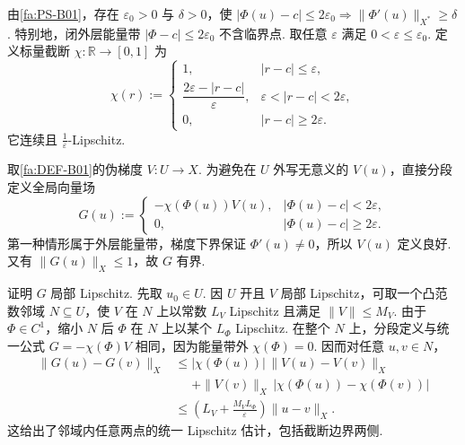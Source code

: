 \begin{FAProof}
由\autoref{fa:PS-B01}，存在 \(\displaystyle\varepsilon_0>0\) 与 \(\displaystyle\delta>0\)，使
\(\displaystyle |\Phi(u)-c|\leqslant2\varepsilon_0 \Longrightarrow \|\Phi'(u)\|_{X^*}\geqslant\delta\).
特别地，闭外层能量带 \(\displaystyle|\Phi-c|\leqslant2\varepsilon_0\) 不含临界点. 取任意 \(\displaystyle\varepsilon\) 满足 \(\displaystyle0<\varepsilon\leqslant\varepsilon_0\). 定义标量截断 \(\displaystyle\chi:\mathbb R\to[0,1]\) 为
\[
\chi(r)
:=
\begin{cases}
1,&|r-c|\leqslant\varepsilon,\\
\dfrac{2\varepsilon-|r-c|}{\varepsilon},&\varepsilon<|r-c|<2\varepsilon,\\
0,&|r-c|\geqslant2\varepsilon.
\end{cases}
\]
它连续且 \(\displaystyle\frac{1}{\varepsilon}\)-Lipschitz.

取\autoref{fa:DEF-B01}的伪梯度 \(\displaystyle V:U\to X\). 为避免在 \(\displaystyle U\) 外写无意义的 \(\displaystyle V(u)\)，直接分段定义全局向量场
\[
G(u)
:=
\begin{cases}
-\chi(\Phi(u))V(u),&|\Phi(u)-c|<2\varepsilon,\\
0,&|\Phi(u)-c|\geqslant2\varepsilon.
\end{cases}
\]
第一种情形属于外层能量带，梯度下界保证 \(\displaystyle\Phi'(u)\neq0\)，所以 \(\displaystyle V(u)\) 定义良好. 又有 \(\displaystyle\|G(u)\|_X\leqslant1\)，故 \(\displaystyle G\) 有界.

证明 \(\displaystyle G\) 局部 Lipschitz. 先取 \(\displaystyle u_0\in U\). 因 \(\displaystyle U\) 开且 \(\displaystyle V\) 局部 Lipschitz，可取一个凸范数邻域 \(\displaystyle N\subseteq U\)，使 \(\displaystyle V\) 在 \(\displaystyle N\) 上以常数 \(\displaystyle L_V\) Lipschitz 且满足 \(\displaystyle\|V\|\leqslant M_V\). 由于 \(\displaystyle\Phi\in C^1\)，缩小 \(\displaystyle N\) 后 \(\displaystyle\Phi\) 在 \(\displaystyle N\) 上以某个 \(\displaystyle L_\Phi\) Lipschitz. 在整个 \(\displaystyle N\) 上，分段定义与统一公式 \(\displaystyle G=-\chi(\Phi)V\) 相同，因为能量带外 \(\displaystyle\chi(\Phi)=0\). 因而对任意 \(\displaystyle u,v\in N\)，
\[
\begin{aligned}
\displaystyle \|G(u)-G(v)\|_X
&\leqslant\displaystyle
|\chi(\Phi(u))|\,\|V(u)-V(v)\|_X\\
&\mathrel{\phantom{\leqslant}}+\displaystyle
\|V(v)\|_X\,|\chi(\Phi(u))-\chi(\Phi(v))|\\[6pt]
&\leqslant\displaystyle
\left(L_V+\frac{M_VL_\Phi}{\varepsilon}\right)\|u-v\|_X.
\end{aligned}
\]
这给出了邻域内任意两点的统一 Lipschitz 估计，包括截断边界两侧.


\end{FAProof}
